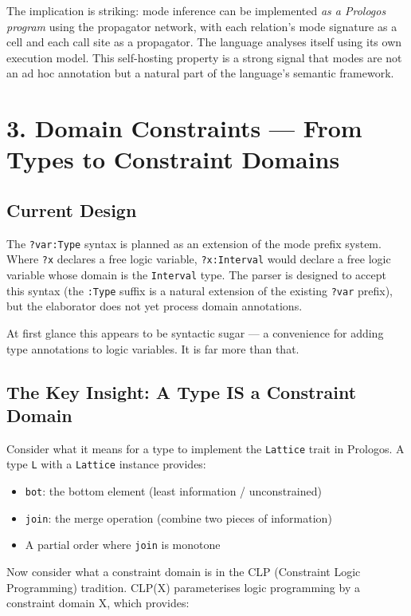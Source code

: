 \documentclass[11pt]{article}
\begin{document}
The implication is striking: mode inference can be implemented \emph{as a Prologos
program} using the propagator network, with each relation's mode signature as a
cell and each call site as a propagator. The language analyses itself using its
own execution model. This self-hosting property is a strong signal that modes are
not an ad hoc annotation but a natural part of the language's semantic framework.
\section{3. Domain Constraints --- From Types to Constraint Domains}
\label{sec:org9760ee4}

\subsection{Current Design}
\label{sec:org74e31b1}

The \texttt{?var:Type} syntax is planned as an extension of the mode prefix system.
Where \texttt{?x} declares a free logic variable, \texttt{?x:Interval} would declare a free
logic variable whose domain is the \texttt{Interval} type. The parser is designed to
accept this syntax (the \texttt{:Type} suffix is a natural extension of the existing
\texttt{?var} prefix), but the elaborator does not yet process domain annotations.

At first glance this appears to be syntactic sugar --- a convenience for adding
type annotations to logic variables. It is far more than that.
\subsection{The Key Insight: A Type IS a Constraint Domain}
\label{sec:org9b0df44}

Consider what it means for a type to implement the \texttt{Lattice} trait in Prologos.
A type \texttt{L} with a \texttt{Lattice} instance provides:

\begin{itemize}
\item \texttt{bot}: the bottom element (least information / unconstrained)
\item \texttt{join}: the merge operation (combine two pieces of information)
\item A partial order where \texttt{join} is monotone
\end{itemize}

Now consider what a constraint domain is in the CLP (Constraint Logic
Programming) tradition. CLP(X) parameterises logic programming by a constraint
domain X, which provides:
\end{document}

